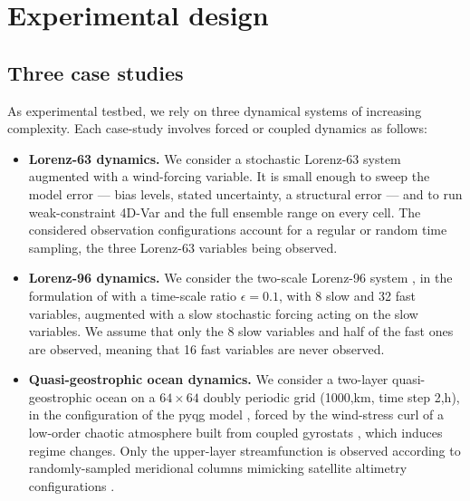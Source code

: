 \section{Experimental design}\label{sec:design}

\subsection{Three case studies}\label{sec:testbeds}

As experimental testbed, we rely on three dynamical systems of increasing complexity. 
Each case-study involves forced or coupled dynamics as follows:
\begin{itemize}
  \item {\bf Lorenz-63 dynamics.} We consider a stochastic Lorenz-63 system \cite{chapron_largescale_2017} augmented with a wind-forcing variable. 
    It is small enough to sweep the model error ---
    bias levels, stated uncertainty, a structural error --- and to run
    weak-constraint 4D-Var and the full ensemble range on every cell. The considered observation configurations account for a regular or random time sampling, the three Lorenz-63 variables being observed. 
  \item {\bf Lorenz-96 dynamics.} We consider the two-scale Lorenz-96 system \cite{lorenz_predictability_1996}, in the formulation of \cite{fatkullin_computational_2004} with a time-scale ratio $\epsilon = 0.1$, with 8 slow and 32 fast variables, augmented with a slow stochastic forcing acting on the slow variables. We assume that only the 8 slow variables and half of the fast ones are observed, meaning that 16 fast variables are never observed.
  \item {\bf Quasi-geostrophic ocean dynamics.} We consider a two-layer quasi-geostrophic ocean \cite{vallis_atmospheric_2017} on a $64\times64$ doubly periodic grid (1000,km, time step 2,h), in the configuration of the pyqg model \cite{abernathey_pyqg_2022,ross_benchmarking_2023}, forced by the wind-stress curl of a low-order chaotic atmosphere built from coupled gyrostats \cite{gluhovsky_structure_1999}, which induces regime changes. Only the upper-layer streamfunction is observed according to randomly-sampled meridional columns mimicking satellite altimetry configurations \cite{febvre_training_2023,ballarotta_resolutions_2019}.
\end{itemize}

